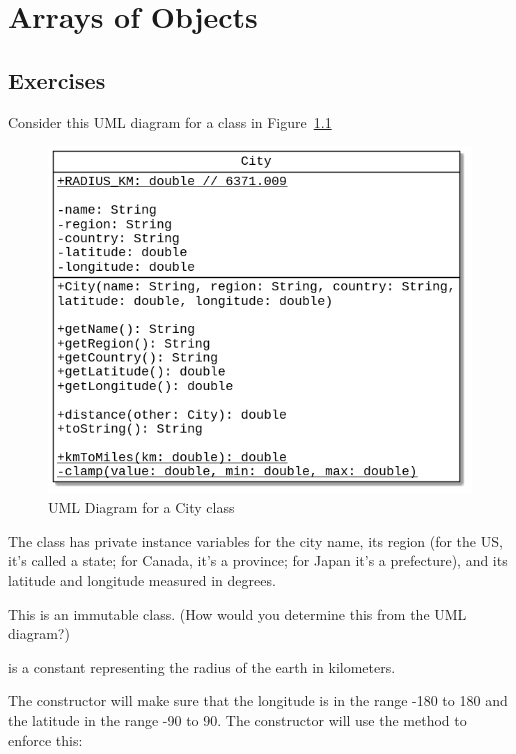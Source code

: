\chapter{Arrays of Objects}

\section{Exercises}

\begin{exercise}
Consider this UML diagram for a  class in Figure~\ref{fig.cityuml}

\begin{figure}[!h]
\begin{center}
\includegraphics[scale=0.5]{figs/ch12/city.png}
\caption{UML Diagram for a City class}
\label{fig.cityuml}
\end{center}
\end{figure}

The class has private instance variables for the city name, its region (for the US, it's called a state; for Canada, it's a province; for Japan it's a prefecture), and its latitude and longitude measured in degrees.

This is an immutable class. (How would you determine this from the UML diagram?)

 is a   constant representing the radius of the earth in kilometers.

The constructor will make sure that the longitude is in the range -180 to 180 and the latitude in the range -90 to 90. The constructor will use the  method to enforce this:


\end{exercise}
